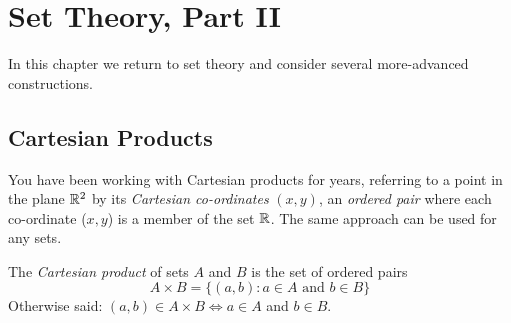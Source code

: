\graphicspath{{6setsii/asy/}}

\section{Set Theory, Part II}\label{chap:sets2}

In this chapter we return to set theory and consider several more-advanced constructions.


\subsection{Cartesian Products}\label{sec:cartprod}

You have been working with Cartesian products for years, referring to a point in the plane $\mathbb{R}^2$ by its \emph{Cartesian co-ordinates} $(x,y)$, an \emph{ordered pair} where each co-ordinate ($x,y$) is a member of the set $\mathbb{R}$. The same approach can be used for any sets.

\begin{defn}{}{}
	The \emph{Cartesian product} of sets $A$ and $B$ is the set of ordered pairs
	\[
		A\times B=\bigl\{(a,b):a\in A\text{ and }b\in B\bigr\}
	\]
	Otherwise said: $(a,b)\in A\times B\iff a\in A$ and $b\in B$.
\end{defn}

